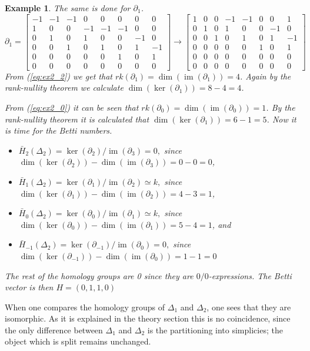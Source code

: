 \documentclass[11pt,a4paper,twoside]{report}
\newtheorem{myex}[mythm]{Example}
\DeclareMathOperator{\im}{im}
\begin{document}
\begin{myex}
The same is done for $\partial_1$.
\begin{equation}\label{eq:ex2_2}
\partial_1=
\begin{bmatrix}
-1 & -1 & -1 & 0 & 0 & 0 & 0 & 0 \\
1 & 0 & 0 & -1 & -1 & -1 & 0 & 0 \\
0 & 1 & 0 & 1 & 0 & 0 & -1 & 0 \\
0 & 0 & 1 & 0 & 1 & 0 & 1 & -1 \\
0 & 0 & 0 & 0 & 0 & 1 & 0 & 1 \\
0 & 0 & 0 & 0 & 0 & 0 & 0 & 0 
\end{bmatrix}
\to
\begin{bmatrix}
1 & 0 & 0 & -1 & -1 & 0 & 0 & 1 \\
0 & 1 & 0 & 1 & 0 & 0 & -1 & 0 \\
0 & 0 & 1 & 0 & 1 & 0 & 1 & -1 \\
0 & 0 & 0 & 0 & 0 & 1 & 0 & 1 \\
0 & 0 & 0 & 0 & 0 & 0 & 0 & 0 \\
0 & 0 & 0 & 0 & 0 & 0 & 0 & 0 
\end{bmatrix}
\end{equation}
From (\ref{eq:ex2_2}) we get that $rk(\partial_1)=\dim(\im(\partial_1))=4$. Again by the rank-nullity theorem we calculate $\dim(\ker(\partial_1))=8-4=4$.

From (\ref{eq:ex2_0}) it can be seen that $rk(\partial_0)=\dim(\im(\partial_0))=1$. By the rank-nullity theorem it is calculated that $\dim(\ker(\partial_1))=6-1=5$. Now it is time for the Betti numbers.
\begin{itemize}
\item $\bar{H}_2(\Delta_2)=\ker(\partial_2)/\im(\partial_{3})=0,$
since $\dim(\ker(\partial_2))-\dim(\im(\partial_{3}))=0-0=0$,
\item$\bar{H}_1(\Delta_2)=\ker(\partial_1)/\im(\partial_{2})\simeq k,$ since $\dim(\ker(\partial_1))-\dim(\im(\partial_{2}))=4-3=1$,
\item$\bar{H}_0(\Delta_2)=\ker(\partial_0)/\im(\partial_{1})\simeq k,$
since $\dim(\ker(\partial_0))-\dim(\im(\partial_{1}))=5-4=1$, and 
\item$\bar{H}_{-1}(\Delta_2)=\ker(\partial_{-1})/\im(\partial_{0})=0,$
since $\dim(\ker(\partial_{-1}))-\dim(\im(\partial_{0}))=1-1=0$
\end{itemize}
The rest of the homology groups are 0 since they are $0/0$-expressions.
The Betti vector is then $H=(0,1,1,0)$
\end{myex}
When one compares the homology groups of $\Delta_1$ and $\Delta_2$, one sees that they are isomorphic. As it is explained in the theory section this is no coincidence, since the only difference between $\Delta_1$ and $\Delta_2$ is the partitioning into simplicies; the object which is split remains unchanged.
\end{document}
